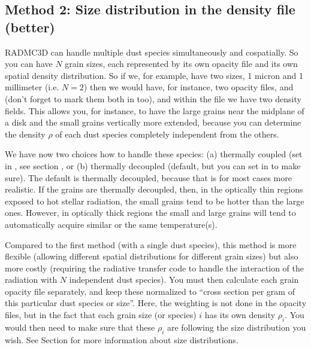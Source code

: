 \documentclass[letterpaper,10pt,english]{sphinxmanual}
\begin{document}
\subsection{Method 2: Size distribution in the density file (better)}
\label{\detokenize{dustradtrans:method-2-size-distribution-in-the-density-file-better}}\label{\detokenize{dustradtrans:sec-grain-size-distributions-method-2}}
RADMC\sphinxhyphen{}3D can handle multiple dust species simultaneously and co\sphinxhyphen{}spatially. So
you can have \(N\) grain sizes, each represented by its own opacity file and
its own spatial density distribution. So if we, for example, have two sizes, 1
micron and 1 millimeter (i.e. \(N=2\)) then we would have, for instance, two
opacity files,  and  (don’t forget
to mark them both in  too), and within the 
file we have two density fields. This allows you, for instance, to have the
large grains near the midplane of a disk and the small grains vertically more
extended, because you can determine the density \(\rho\) of each dust
species completely independent from the others.

We have now two choices how to handle these species: (a) thermally coupled (set
 in , see section {\hyperref[\detokenize{inputoutputfiles:sec-radmc-inp}]{}}, or (b)
thermally decoupled (default, but you can set  in
 to make sure). The default is thermally decoupled, because that
is for most cases more realistic. If the grains are thermally decoupled, then,
in the optically thin regions exposed to hot stellar radiation, the small grains
tend to be hotter than the large ones. However, in optically thick regions the
small and large grains will tend to automatically acquire similar or the same
temperature(s).

Compared to the first method (with a single dust species), this method is more
flexible (allowing different spatial distributions for different grain sizes)
but also more costly (requiring the radiative transfer code to handle the
interaction of the radiation with \(N\) independent dust species). You must
then calculate each grain opacity file separately, and keep these normalized to
“cross section per gram of this particular dust species or size”. Here, the
weighting is not done in the opacity files, but in the fact that each grain size
(or species) \(i\) has its own density \(\rho_i\). You would then need
to make sure that these \(\rho_i\) are following the size distribution you
wish. See Section {\hyperref[\detokenize{dustradtrans:sec-math-of-grain-size-distributions}]{}} for more
information about size distributions.
\end{document}
